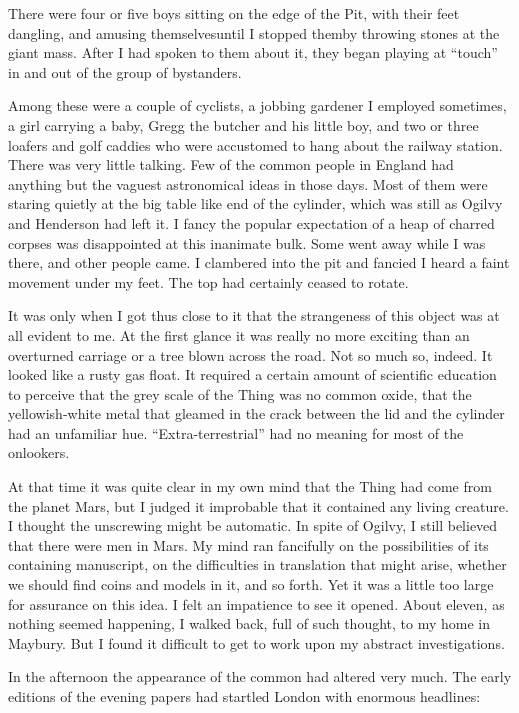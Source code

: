 There were four or five boys sitting on the edge of the Pit, with
their feet dangling, and amusing themselves\dash{}until I stopped
them\dash{}by throwing stones at the giant mass. After I had spoken to
them about it, they began playing at ``touch'' in and out of the
group of bystanders.

Among these were a couple of cyclists, a jobbing gardener I
employed sometimes, a girl carrying a baby, Gregg the butcher and
his little boy, and two or three loafers and golf caddies who were
accustomed to hang about the railway station. There was very little
talking. Few of the common people in England had anything but the
vaguest astronomical ideas in those days. Most of them were staring
quietly at the big table like end of the cylinder, which was still
as Ogilvy and Henderson had left it. I fancy the popular
expectation of a heap of charred corpses was disappointed at this
inanimate bulk. Some went away while I was there, and other people
came. I clambered into the pit and fancied I heard a faint movement
under my feet. The top had certainly ceased to rotate.

It was only when I got thus close to it that the strangeness of
this object was at all evident to me. At the first glance it was
really no more exciting than an overturned carriage or a tree blown
across the road. Not so much so, indeed. It looked like a rusty gas
float. It required a certain amount of scientific education to
perceive that the grey scale of the Thing was no common oxide, that
the yellowish-white metal that gleamed in the crack between the lid
and the cylinder had an unfamiliar hue. ``Extra-terrestrial'' had no
meaning for most of the onlookers.

At that time it was quite clear in my own mind that the Thing had
come from the planet Mars, but I judged it improbable that it
contained any living creature. I thought the unscrewing might be
automatic. In spite of Ogilvy, I still believed that there were men
in Mars. My mind ran fancifully on the possibilities of its
containing manuscript, on the difficulties in translation that
might arise, whether we should find coins and models in it, and so
forth. Yet it was a little too large for assurance on this idea. I
felt an impatience to see it opened. About eleven, as nothing
seemed happening, I walked back, full of such thought, to my home
in Maybury. But I found it difficult to get to work upon my
abstract investigations.

In the afternoon the appearance of the common had altered very
much. The early editions of the evening papers had startled London
with enormous headlines:

